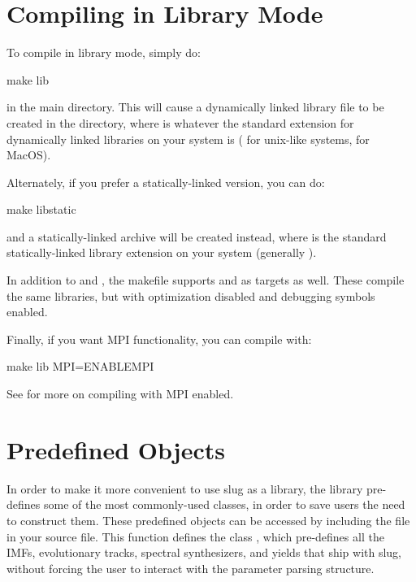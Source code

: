\documentclass[letterpaper,10pt,english]{sphinxmanual}
\begin{document}
\section{Compiling in Library Mode}
\label{\detokenize{library:compiling-in-library-mode}}\label{\detokenize{library:ssec-library-mode}}
To compile in library mode, simply do:

\begin{sphinxVerbatim}[commandchars=\\\{\}]
make lib
\end{sphinxVerbatim}

in the main directory. This will cause a dynamically linked library
file  to be created in the  directory, where 
is whatever the standard extension for dynamically linked libraries on
your system is ( for unix-like systems,  for MacOS).

Alternately, if you prefer a statically-linked version, you can do:

\begin{sphinxVerbatim}[commandchars=\\\{\}]
make libstatic
\end{sphinxVerbatim}

and a statically-linked archive  will be created instead,
where  is the standard statically-linked library extension on
your system (generally ).

In addition to  and , the makefile supports
 and  as targets as well. These
compile the same libraries, but with optimization disabled and
debugging symbols enabled.

Finally, if you want MPI functionality, you can compile with:

\begin{sphinxVerbatim}[commandchars=\\\{\}]
make lib MPI=ENABLE\PYGZus{}MPI
\end{sphinxVerbatim}

See {\hyperref[\detokenize{compiling:ssec-compiling}]{}} for more on compiling with MPI enabled.


\section{Predefined Objects}
\label{\detokenize{library:predefined-objects}}\label{\detokenize{library:ssec-predefined-objects}}
In order to make it more convenient to use slug as a library, the
library pre-defines some of the most commonly-used classes, in order
to save users the need to construct them. These predefined objects can
be accessed by including the file  in your source
file. This function defines the class , which
pre-defines all the IMFs, evolutionary tracks, spectral synthesizers,
and yields that ship with slug, without forcing the user to interact
with the parameter parsing structure.
\end{document}
